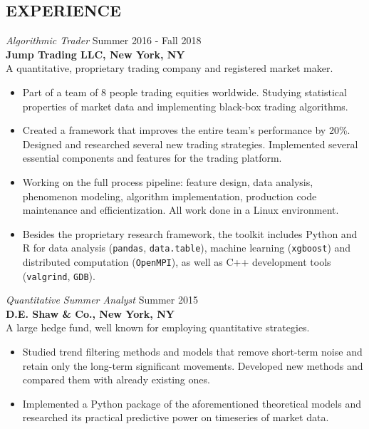 \documentclass[margin]{res}
\begin{document}
\begin{resume}
  \section{EXPERIENCE}
  {\sl Algorithmic Trader} \hfill Summer 2016 - Fall 2018 \\
  \textbf{Jump Trading LLC, New York, NY} \\
  A quantitative, proprietary trading company and registered market maker.
  \begin{itemize}  \itemsep -2pt %
    \item Part of a team of 8 people trading equities worldwide.
      Studying statistical properties of market data and implementing black-box
      trading algorithms.
    \item Created a framework that improves the entire team's performance by 20\%. Designed and
      researched several new trading strategies. Implemented several essential components and features
      for the trading platform.
    \item Working on the full process pipeline: feature design, data analysis,
      phenomenon modeling, algorithm implementation, production code maintenance
      and efficientization. All work done in a Linux environment.
    \item Besides the proprietary research framework, the toolkit includes Python and R
      for data analysis (\texttt{pandas}, \texttt{data.table}), machine learning (\texttt{xgboost})
      and distributed computation (\texttt{OpenMPI}), as well as C++ development tools
      (\texttt{valgrind}, \texttt{GDB}).
  \end{itemize}


  {\sl Quantitative Summer Analyst} \hfill Summer 2015 \\
  \textbf{D.E. Shaw \& Co., New York, NY} \\
  A large hedge fund, well known for employing quantitative strategies.
  \begin{itemize}  \itemsep -2pt %
    \item Studied trend filtering methods and models
      that remove short-term noise and retain only the long-term significant movements.
      Developed new methods and compared them with already existing ones.
    \item Implemented a Python package of the aforementioned theoretical models
      and researched its practical predictive power on timeseries of market data.
  \end{itemize}


\end{resume}
\end{document}
